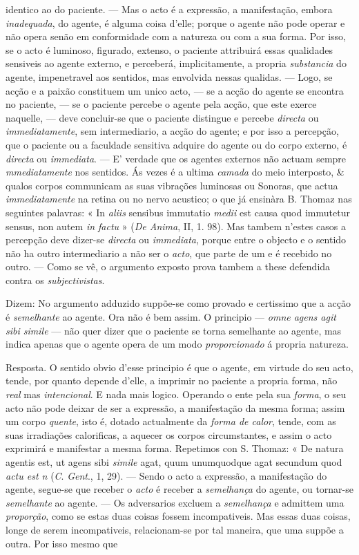 identico ao do paciente. --- Mas o acto é a expressão, a manifestação, embora \emph{inadequada}, do agente, é alguma coisa d'elle; porque o agente não pode operar e não opera senão em conformidade com a natureza ou com a sua forma. Por isso, se o acto é luminoso, figurado, extenso, o paciente attribuirá essas qualidades sensiveis ao agente externo, e perceberá, implicitamente, a propria \emph{substancia} do agente, impenetravel aos sentidos, mas envolvida nessas qualidas. --- Logo, se acção e a paixão constituem um unico acto, --- se a acção do agente se encontra no paciente, --- se o paciente percebe o agente pela acção, que este exerce naquelle, --- deve concluir-se que o paciente distingue e percebe \emph{directa} ou \emph{immediatamente}, sem intermediario, a acção do agente; e por isso a percepção, que o paciente ou a faculdade sensitiva adquire do agente ou do corpo externo, é \emph{directa} ou \emph{immediata}. --- E' verdade que os agentes externos não actuam sempre \emph{mmediatamente} nos sentidos. Ás vezes é a ultima \emph{camada} do meio interposto, \& qualos corpos communicam as suas vibrações luminosas ou Sonoras, que actua \emph{immediatamente} na retina ou no nervo acustico; o que já ensinàra B. Thomaz nas seguintes palavras: « In \emph{aliis} sensibus immutatio \emph{medii} est causa quod immutetur sensus, non autem \emph{in factu} » (\emph{De Anima}, II, 1. 98). Mas tambem n'estes casos a percepção deve dizer-se \emph{directa} ou \emph{immediata}, porque entre o objecto e o sentido não ha outro intermediario a não ser o \emph{acto}, que parte de um e é recebido no outro. --- Como se vê, o argumento exposto prova tambem a these defendida contra os \emph{subjectivistas}.\par Dizem: No argumento adduzido suppõe-se como provado e certissimo que a acção é \emph{semelhante} ao agente. Ora não é bem assim. O principio --- \emph{omne agens agit sibi simile} --- não quer dizer que o paciente se torna semelhante ao agente, mas indica apenas que o agente opera de um modo \emph{proporcionado} á propria natureza.\par Resposta. O sentido obvio d'esse principio é que o agente, em virtude do seu acto, tende, por quanto depende d'elle, a imprimir no paciente a propria forma, não \emph{real} mas \emph{intencional}. E nada mais logico. Operando o ente pela sua \emph{forma}, o seu acto não pode deixar de ser a expressão, a manifestação da mesma forma; assim um corpo \emph{quente}, isto é, dotado actualmente da \emph{forma de calor}, tende, com as suas irradiações calorificas, a aquecer os corpos circumstantes, e assim o acto exprimirá e manifestar a mesma forma. Repetimos con S. Thomaz: « De natura agentis est, ut agens sibi \emph{simile} agat, quum unumquodque agat secundum quod \emph{actu est n} (\emph{C}. \emph{Gent}., 1, 29). --- Sendo o acto a expressão, a manifestação do agente, segue-se que receber o \emph{acto} é receber a \emph{semelhança} do agente, ou tornar-se \emph{semelhante} ao agente. --- Os adversarios excluem a \emph{semelhança} e admittem uma \emph{proporção}, como se estas duas coisas fossem incompativeis. Mas essas duas coisas, longe de serem incompativeis, relacionam-se por tal maneira, que uma suppõe a outra. Por isso mesmo que 